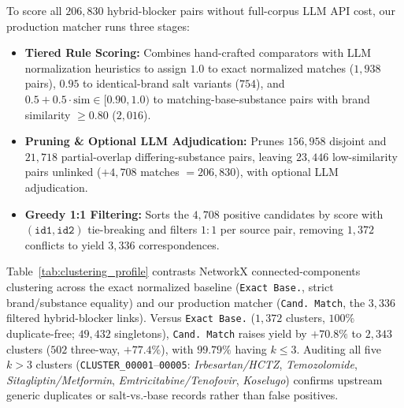 \documentclass{llncs}
\begin{document}
To score all $206{,}830$ hybrid-blocker pairs without full-corpus LLM API cost, our production matcher runs three stages:
\begin{itemize}
  \item \textbf{Tiered Rule Scoring:} Combines hand-crafted comparators with LLM normalization heuristics to assign $1.0$ to exact normalized matches ($1{,}938$ pairs), $0.95$ to identical-brand salt variants ($754$), and $0.5 + 0.5 \cdot \text{sim} \in [0.90, 1.0)$ to matching-base-substance pairs with brand similarity $\ge 0.80$ ($2{,}016$).
  \item \textbf{Pruning \& Optional LLM Adjudication:} Prunes $156{,}958$ disjoint and $21{,}718$ partial-overlap differing-substance pairs, leaving $23{,}446$ low-similarity pairs unlinked ($+4{,}708$ matches $= 206{,}830$), with optional LLM adjudication.
  \item \textbf{Greedy 1:1 Filtering:} Sorts the $4{,}708$ positive candidates by score with $(\texttt{id1}, \texttt{id2})$ tie-breaking and filters $1{:}1$ per source pair, removing $1{,}372$ conflicts to yield $3{,}336$ correspondences.
\end{itemize}

Table~\ref{tab:clustering_profile} contrasts NetworkX connected-components clustering across the exact normalized baseline (\texttt{Exact Base.}, strict brand/substance equality) and our production matcher (\texttt{Cand.\ Match}, the $3{,}336$ filtered hybrid-blocker links). Versus \texttt{Exact Base.} ($1{,}372$ clusters, $100\%$ duplicate-free; $49{,}432$ singletons), \texttt{Cand.\ Match} raises yield by $+70.8\%$ to $2{,}343$ clusters ($502$ three-way, $+77.4\%$), with $99.79\%$ having $k \le 3$. Auditing all five $k > 3$ clusters (\texttt{CLUSTER\_00001}--\texttt{00005}: \textit{Irbesartan/HCTZ}, \textit{Temozolomide}, \textit{Sitagliptin/Metformin}, \textit{Emtricitabine/Tenofovir}, \textit{Koselugo}) confirms upstream generic duplicates or salt-vs.-base records rather than false positives.
\end{document}
